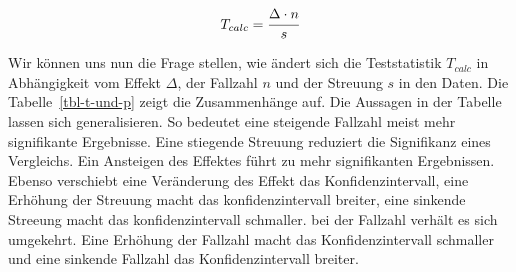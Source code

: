 \documentclass[
  letterpaper,
  DIV=11,
  oneside]{scrreport}
\begin{document}
\[
T_{calc} = \cfrac{\Delta \cdot n}{s}
\]

Wir können uns nun die Frage stellen, wie ändert sich die Teststatistik
\(T_{calc}\) in Abhängigkeit vom Effekt \(\Delta\), der Fallzahl \(n\)
und der Streuung \(s\) in den Daten. Die Tabelle~\ref{tbl-t-und-p} zeigt
die Zusammenhänge auf. Die Aussagen in der Tabelle lassen sich
generalisieren. So bedeutet eine steigende Fallzahl meist mehr
signifikante Ergebnisse. Eine stiegende Streuung reduziert die
Signifikanz eines Vergleichs. Ein Ansteigen des Effektes führt zu mehr
signifikanten Ergebnissen. Ebenso verschiebt eine Veränderung des Effekt
das Konfidenzintervall, eine Erhöhung der Streuung macht das
konfidenzintervall breiter, eine sinkende Streeung macht das
konfidenzintervall schmaller. bei der Fallzahl verhält es sich
umgekehrt. Eine Erhöhung der Fallzahl macht das Konfidenzintervall
schmaller und eine sinkende Fallzahl das Konfidenzintervall breiter.
\end{document}
